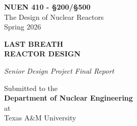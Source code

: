 \documentclass[12pt]{article}
\numberwithin{equation}{section}
\begin{document}
\pagestyle{empty}

\begin{titlepage}
\centering

\vspace*{1in}

{\Large\bfseries NUEN 410 - \S200/\S500}\\[0.4em]
{\large The Design of Nuclear Reactors}\\[0.2em]
{\normalsize Spring 2026}

\vspace{1.5in}

{\fontsize{42}{50}\selectfont\bfseries 
LAST BREATH\\[0.2em]
REACTOR DESIGN\par}

\vspace{0.5in}

{\LARGE\itshape Senior Design Project Final Report\par}

\vfill

{\large 
Submitted to the\\[0.3em]
\textbf{Department of Nuclear Engineering}\\
at\\[.2em]
Texas A\&M University}

\newpage





\vspace{1.0in}
\end{titlepage}
\end{document}
